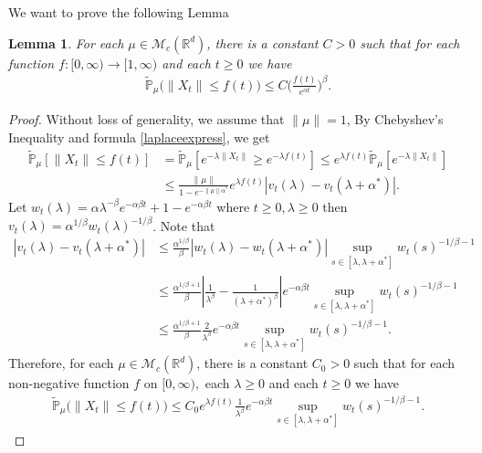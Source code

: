 \documentclass[12pt,oneside,english]{amsart}
\theoremstyle{plain}
\newtheorem{lem}[thm]{Lemma}
\theoremstyle{definition}
\numberwithin{equation}{section}
\newcommand{\added}[1]{{\color{blue}#1}}\newcommand{\deleted}[1]{{\color{red}#1}}
\begin{document}
We want to prove the following Lemma
\added{
\begin{lem}\label{lem: control of XT}
	For each $\mu\in \mathcal M_c(\mathbb R^d)$, there is a constant $C>0$ such that for each function $f:[0,\infty)\to [1,\infty)$ and each $t\geq 0$ we have
\begin{align}
    \mathbb{\tilde{P}}_{\mu}\big(\|X_t\|\leq f(t)\big)\leq C \Big(\frac{f(t)}{e^{\alpha t}}\Big)^{\beta}.
\end{align}
\end{lem}
}
\begin{proof}
 \deleted{Without loss of generality, we assume that $\|\mu\|=1$,} By Chebyshev's Inequality and formula \eqref{laplaceexpress}, we get
\added{
\begin{align*}
    \mathbb{\tilde{P}}_{\mu}[\|X_t\|\leq f(t)]&=\mathbb{\tilde{P}}_{\mu}[e^{-\lambda\|X_t\|}\geq e^{-\lambda f(t)}]\leq e^{\lambda f(t)}\mathbb{\tilde{P}}_{\mu}[e^{-\lambda \|X_t\|}]\\
    &\leq \frac{\|\mu\|}{1-e^{-\|\mu\|\alpha^*}}e^{\lambda f(t)}\left|v_t(\lambda)-v_t(\lambda+\alpha^*)\right|.
\end{align*}
}
	Let $w_t(\lambda)=\alpha \lambda^{-\beta}e^{-\alpha \beta t}+1-e^{-\alpha\beta t}$ where $t\geq 0,\lambda\geq0$ then $v_t(\lambda)=\alpha^{1/\beta}w_t(\lambda)^{-1/\beta}$.
\added{Note that}
\begin{align*}
    \left|v_t(\lambda)-v_t(\lambda+\alpha^*)\right|&\leq\frac {\alpha^{1/\beta}}{\beta} \left|w_t(\lambda)-w_t(\lambda+\alpha^*)\right| \sup_{s\in [\lambda,\lambda+\alpha^*]}w_t(s)^{-1/\beta-1}\\
    &\leq  \frac{\alpha^{1/\beta+1}}{\beta}\left|\frac{1}{\lambda^{\beta}}-\frac{1}{(\lambda+\alpha^*)^{\beta}}\right|e^{-\alpha\beta t} \sup_{s\in [\lambda,\lambda+\alpha^*]}w_t(s)^{-1/\beta-1}\\
    &\leq  \frac{\alpha^{1/\beta+1}}{\beta}\frac{2}{\lambda^{\beta}}e^{-\alpha\beta t} \sup_{s\in [\lambda,\lambda+\alpha^*]}w_t(s)^{-1/\beta-1}.
\end{align*}
Therefore, \added{for each $\mu\in \mathcal M_c(\mathbb R^d)$, there is a constant $C_0>0$ such that for each non-negative function $f$ on $[0,\infty),$ each $\lambda \geq 0$ and each $t\geq 0$ we have }
\begin{align}
\label{eq: inequality before take lambda}
    \mathbb{\tilde{P}}_{\mu}\big(\|X_t\|\leq f(t)\big)
    \leq C_0e^{\lambda f(t)}\frac{1}{\lambda^{\beta}}e^{-\alpha\beta t} \sup_{s\in [\lambda,\lambda+\alpha^*]}w_t(s)^{-1/\beta-1}.
\end{align}

\end{proof}
\end{document}
